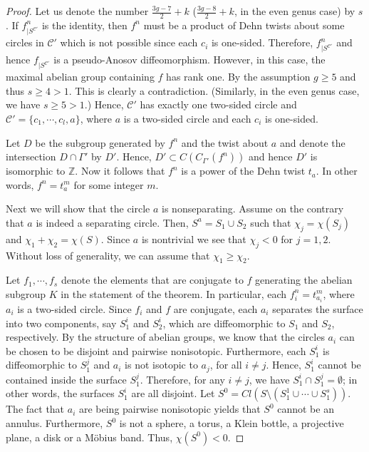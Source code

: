 \documentclass[11 pt]{amsart}
\theoremstyle{definition}
\begin{document}
\begin{proof}
Let us denote the number $\displaystyle\frac{3g-7}{2}+k$
($\displaystyle\frac{3g-8}{2}+k$, in the even genus case) by $s$. If
$f^{n}_{\mid S^{\mathcal{C'}}}$ is the identity, then $f^{n}$ must
be a product of Dehn twists about some circles in $\mathcal{C'}$
which is not possible since each $c_{i}$ is one-sided. Therefore,
$f^{n}_{\mid S^{\mathcal{C'}}}$ and hence $f_{\mid
S^{\mathcal{C'}}}$ is a pseudo-Anosov diffeomorphism. However, in
this case, the maximal abelian group containing $f$ has rank one. By
the assumption $g\geq 5$ and thus $s\geq 4 > 1$. This is clearly a
contradiction. (Similarly, in the even genus case, we have $s\geq 5
> 1$.) Hence, $\mathcal{C'}$ has exactly one two-sided circle and
$\mathcal{C'}= \{c_{1}, \cdots, c_l, a\}$, where $a$ is a
two-sided circle and each $c_i$ is one-sided.

Let  $D$ be the subgroup generated by $f^{n}$ and the twist about
$a$ and denote the intersection $D \cap \Gamma'$ by $D'$. Hence, $D'
\subset C(C_{\Gamma'}(f^{n}))$ and hence $D'$ is isomorphic to
$\mathbb{Z}$. Now it follows that $f^{n}$ is a power of the Dehn
twist $t_{a}$. In other words, $f^{n} = t_{a}^{m}$ for some integer
$m$.

Next we will show that the circle $a$ is nonseparating. Assume on
the contrary that $a$ is indeed a separating circle. Then, $S^{a} =
S_{1} \cup S_{2}$ such that $\chi_{j}=\chi(S_{j})$ and
$\chi_{1}+\chi_{2}=\chi(S)$. Since $a$ is nontrivial we see that
$\chi_{j} < 0$ for $j=1,2$. Without loss of generality, we can
assume that $\chi_{1} \geq \chi_{2}$.

Let $f_{1}, \cdots, f_s$ denote the elements that are conjugate to
$f$ generating the abelian subgroup $K$ in the statement of the
theorem. In particular, each $f^{n}_{i} = t_{a_{i}}^{m}$, where
$a_{i}$ is a two-sided circle. Since $f_i$ and $f$ are conjugate,
each $a_{i}$ separates the surface into two components, say
$S_{1}^{i}$ and $S_{2}^{i}$, which are diffeomorphic to $S_1$ and
$S_2$, respectively. By the structure of abelian groups, we know
that the circles $a_{i}$ can be chosen to be disjoint and pairwise
nonisotopic. Furthermore, each $S_{1}^{i}$ is diffeomorphic to
$S_{1}^{j}$ and $a_{i}$ is not isotopic to $a_{j}$, for all $i \neq
j$. Hence, $S_1^{i}$ cannot be contained inside the surface
$S_{1}^{j}$.  Therefore, for any $i\neq j$, we have $S_{1}^{i} \cap
S_{1}^{j} = \emptyset$; in other words, the surfaces $S_{1}^{i}$ are
all disjoint. Let $S^{0} = Cl(S \setminus (S_{1}^{1} \cup \cdots
\cup S_{1}^s))$. The fact that $a_{i}$ are being pairwise
nonisotopic yields that $S^{0}$ cannot be an annulus.  Furthermore,
$S^{0}$ is not a sphere, a torus, a Klein bottle, a projective
plane, a disk or a M\"obius band. Thus, $\chi(S^{0}) < 0$.


\end{proof}
\end{document}
